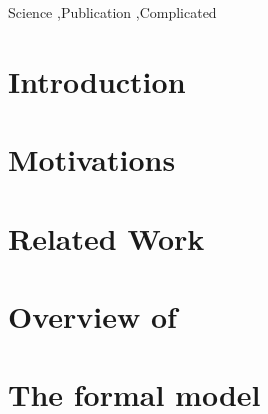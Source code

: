 \documentclass[5p]{elsarticle}
\begin{document}
\begin{frontmatter}
\begin{abstract}

\end{abstract}

\begin{keyword}
Science \sep Publication \sep Complicated
\end{keyword}

\end{frontmatter}


\section{Introduction}
\label{sec:introduction}


\section{Motivations}
\label{sec:motivation}


\section{Related Work}
\label{sec:related_work}


\section{Overview of \mad}
\label{sec:mad_model}


\section{The \mad formal model}
\label{sec:formal_model}

\end{document}
